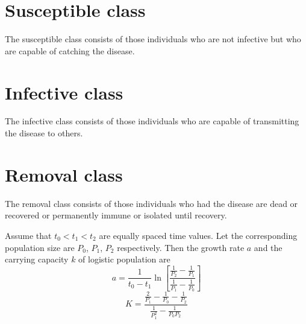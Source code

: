 \documentclass[../main-sheet.tex]{subfiles}
\begin{document}
\section{Susceptible class}
The susceptible class consists of those individuals who are not infective but who are capable of catching the disease.
\section{Infective class}
The infective class consists of those individuals who are capable of transmitting the disease to others.
\section{Removal class}
The removal class consists of those individuals who had the disease are dead or recovered or permanently immune or isolated until recovery.
\begin{prob}
    Assume that \(t_0<t_1<t_2\) are equally spaced time values. Let the corresponding population size are \(P_0\), \(P_1\), \(P_2\) respectively. Then the growth rate \(a\) and the carrying capacity \(k\) of logistic population are
    \[
        a=\frac{1}{t_0-t_1}\ln \left[ \frac{\frac{1}{P_2}-\frac{1}{P_1}}{\frac{1}{P_1}-\frac{1}{P_0}} \right]
    \]
    \[
        K=\frac{\frac{2}{P_1}-\frac{1}{P_0}-\frac{1}{P_2}}{\frac{1}{P_1^2}-\frac{1}{P_0P_2}}
    \]
\end{prob}
\end{document}
